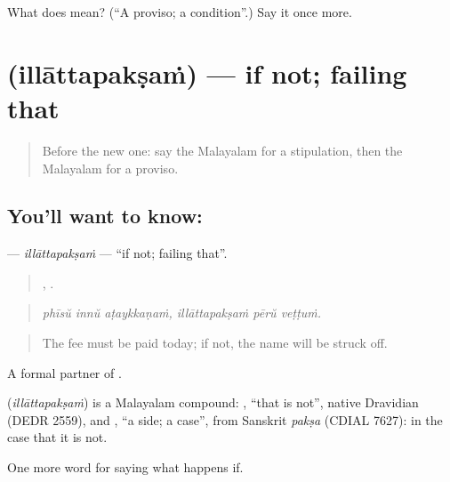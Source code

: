 \begin{tcolorbox}[breakable,colback=teal!4,colframe=teal!35!black,title={Before you move on}]
What does  mean? (\textquotedblleft{}A proviso; a condition\textquotedblright{}.) Say it once more.
\end{tcolorbox}
\section[\texorpdfstring{\ml{ഇല്ലാത്തപക്ഷം} (illāttapakṣaṁ)}{ഇല്ലാത്തപക്ഷം (illāttapakṣaṁ)}]{ (illāttapakṣaṁ) — if not; failing that}

\label{lesson:ML-C440-illattapaksam}



\begin{quote}
Before the new one: say the Malayalam for a stipulation, then the Malayalam for a proviso.
\end{quote}

\subsection*{You'll want to know: }
\textbf{} — \emph{illāttapakṣaṁ} — \textquotedblleft{}if not; failing that\textquotedblright{}.

\begin{quote}
  ,   .
\end{quote}

\begin{quote}
\emph{phīsŭ innŭ aṭaykkaṇaṁ, illāttapakṣaṁ pērŭ veṭṭuṁ.}
\end{quote}

\begin{quote}
The fee must be paid today; if not, the name will be struck off.
\end{quote}

A formal partner of .

\begin{cousinweb}
\textbf{} (\emph{illāttapakṣaṁ}) is a Malayalam compound: , \textquotedblleft{}that is not\textquotedblright{}, native Dravidian (DEDR 2559), and , \textquotedblleft{}a side; a case\textquotedblright{}, from Sanskrit \emph{pakṣa} (CDIAL 7627): in the case that it is not.
\end{cousinweb}

\begin{grammarlens}[title={What you've built}]
One more word for saying what happens if.
\end{grammarlens}

